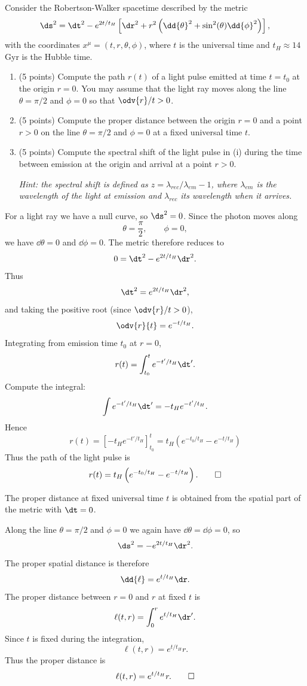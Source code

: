 \renewcommand\L{\mathcal{L}}

\begin{problem}[1]
  Consider the Robertson-Walker spacetime described by the metric
  \[%
    \ds^2 = \dt^2 - e^{2t/t_H}\left[\dr^2 + r^2\left(\dd{\theta}^2 + \sin^2(\theta)\dd{\phi}^2\right)\right]
  ,\]%
  with the coordinates $x^\mu = (t, r, \theta, \phi)$, where $t$ is the universal time and $t_H \approx 14$ Gyr is the Hubble time.
  \begin{enumerate}
    \item (5 points) Compute the path $r(t)$ of a light pulse emitted at time $t = t_0$ at the origin $r = 0$. You may assume that the light ray moves along the line $\theta = \pi/2$ and $\phi = 0$ so that $\odv{r}/{t} > 0$.
    \item (5 points) Compute the proper distance between the origin $r = 0$ and a point $r > 0$ on the line $\theta = \pi/2$ and $\phi = 0$ at a fixed universal time $t$.
    \item (5 points) Compute the spectral shift of the light pulse in (i) during the time between emission at the origin and arrival at a point $r > 0$.

      \textit{Hint: the spectral shift is defined as $z = \lambda_{rec}/\lambda_{em} - 1$, where $\lambda_{em}$ is the wavelength of the light at emission and $\lambda_{rec}$ its wavelength when it arrives.}
  \end{enumerate}
\end{problem}

\begin{solution}[(i)]
  For a light ray we have a null curve, so $\ds^2 = 0$. Since the photon moves along
  \[%
    \theta = \frac{\pi}{2}, \qquad \phi = 0
  ,\]%
  we have $\dd{\theta} = 0$ and $\dd{\phi} = 0$. The metric therefore reduces to
  \[%
    0 = \dt^2 - e^{2t/t_H} \dr^2
  .\]%
  Thus
  \[%
    \dt^2 = e^{2t/t_H} \dr^2
  ,\]%
  and taking the positive root (since $\odv{r}/{t} > 0$),
  \[%
    \odv{r}{t} = e^{-t/t_H}
  .\]%
  Integrating from emission time $t_0$ at $r = 0$,
  \[%
    r(t) = \int_{t_0}^t e^{-t'/t_H} \dt'
  .\]%
  Compute the integral:
  \[%
    \int e^{-t'/t_H} \dt' = -t_H e^{-t'/t_H}
  .\]%
  Hence
  \[%
    r(t) = \left[-t_H e^{-t'/t_H}\right]_{t_0}^{t} = t_H\left(e^{-t_0/t_H} - e^{-t/t_H}\right)
  \]%
  Thus the path of the light pulse is
  \[%
    r(t) = t_H\left(e^{-t_0/t_H} - e^{-t/t_H}\right)
  .\qedhere\]%
\end{solution}

\begin{solution}[(ii)]
  The proper distance at fixed universal time $t$ is obtained from the spatial part of the metric with $\dt = 0$.

  Along the line $\theta = \pi/2$ and $\phi = 0$ we again have $\dd{\theta} = \dd{\phi} = 0$, so
  \[%
    \ds^2 = -e^{2t/t_H} \dr^2
  .\]%
  The proper spatial distance is therefore
  \[%
    \dd{\ell} = e^{t/t_H} \dr
  .\]%
  The proper distance between $r=0$ and $r$ at fixed $t$ is
  \[%
    \ell(t,r) = \int_0^r e^{t/t_H} \dr'
  .\]%
  Since $t$ is fixed during the integration,
  \[%
    \ell(t,r) = e^{t/t_H} r
  .\]%
  Thus the proper distance is
  \[%
    \ell(t,r) = e^{t/t_H} r
  .\qedhere\]%
\end{solution}

